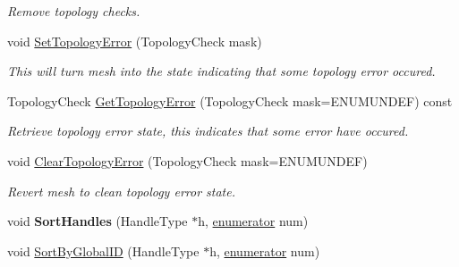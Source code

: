 \begin{DoxyCompactItemize}
\begin{DoxyCompactList}\small\item\em Remove topology checks. \end{DoxyCompactList}\item 
\hypertarget{classINMOST_1_1Mesh_a5ac6bf21484fbe477cde2234ddef555e}{void \hyperlink{classINMOST_1_1Mesh_a5ac6bf21484fbe477cde2234ddef555e}{Set\-Topology\-Error} (Topology\-Check mask)}\label{classINMOST_1_1Mesh_a5ac6bf21484fbe477cde2234ddef555e}

\begin{DoxyCompactList}\small\item\em This will turn mesh into the state indicating that some topology error occured. \end{DoxyCompactList}\item 
\hypertarget{classINMOST_1_1Mesh_aedab01e9e2b9f6294f20a148719998ea}{Topology\-Check \hyperlink{classINMOST_1_1Mesh_aedab01e9e2b9f6294f20a148719998ea}{Get\-Topology\-Error} (Topology\-Check mask=E\-N\-U\-M\-U\-N\-D\-E\-F) const }\label{classINMOST_1_1Mesh_aedab01e9e2b9f6294f20a148719998ea}

\begin{DoxyCompactList}\small\item\em Retrieve topology error state, this indicates that some error have occured. \end{DoxyCompactList}\item 
\hypertarget{classINMOST_1_1Mesh_a1d4d3c7dd08bd37844494d08adf8ac2f}{void \hyperlink{classINMOST_1_1Mesh_a1d4d3c7dd08bd37844494d08adf8ac2f}{Clear\-Topology\-Error} (Topology\-Check mask=E\-N\-U\-M\-U\-N\-D\-E\-F)}\label{classINMOST_1_1Mesh_a1d4d3c7dd08bd37844494d08adf8ac2f}

\begin{DoxyCompactList}\small\item\em Revert mesh to clean topology error state. \end{DoxyCompactList}\item 
\hypertarget{classINMOST_1_1Mesh_ae49994e93f25513716f352933f5c0599}{void {\bfseries Sort\-Handles} (Handle\-Type $\ast$h, \hyperlink{classINMOST_1_1Storage_ae333dfced6fa9cfde0c8e7dcf1b0cc2b}{enumerator} num)}\label{classINMOST_1_1Mesh_ae49994e93f25513716f352933f5c0599}

\item 
void \hyperlink{classINMOST_1_1Mesh_a9f8cfa72de874bd9a17fb0067ac8d515}{Sort\-By\-Global\-I\-D} (Handle\-Type $\ast$h, \hyperlink{classINMOST_1_1Storage_ae333dfced6fa9cfde0c8e7dcf1b0cc2b}{enumerator} num)
\end{DoxyCompactItemize}

